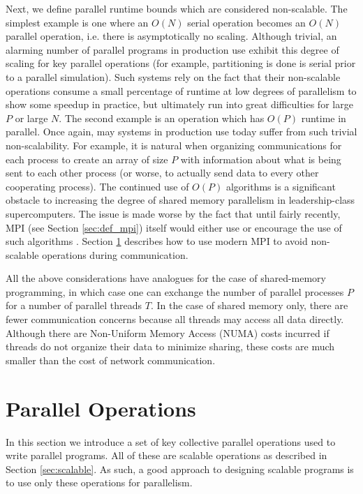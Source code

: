 Next, we define parallel runtime bounds which are considered non-scalable.
The simplest example is one where an $O(N)$ serial operation becomes
an $O(N)$ parallel operation, i.e. there is asymptotically no scaling.
Although trivial, an alarming number of parallel programs in production
use exhibit this degree of scaling for key parallel operations
(for example, partitioning is done is serial prior to a parallel simulation).
Such systems rely on the fact that their non-scalable operations
consume a small percentage of runtime at low degrees of parallelism
to show some speedup in practice, but ultimately run into great difficulties
for large $P$ or large $N$.
The second example is an operation which has $O(P)$ runtime in parallel.
Once again, may systems in production use today suffer from such
trivial non-scalability.
For example, it is natural when organizing communications for each process to create
an array of size $P$ with information about what is being sent to each
other process (or worse, to actually send data to every other cooperating process).
The continued use of $O(P)$ algorithms is a significant obstacle to
increasing the degree of shared memory parallelism in leadership-class supercomputers.
The issue is made worse by the fact that until fairly recently,
MPI (see Section \ref{sec:def_mpi}) itself would either use
or encourage the use of such algorithms \cite{balaji2009mpi}.
Section \ref{sec:paraops} describes how to use modern MPI
to avoid non-scalable operations during communication.

All the above considerations have analogues for the case of shared-memory programming,
in which case one can exchange the number of parallel processes $P$ for a number
of parallel threads $T$.
In the case of shared memory only, there are fewer communication concerns because
all threads may access all data directly.
Although there are Non-Uniform Memory Access (NUMA) costs incurred if threads do
not organize their data to minimize sharing, these costs are much smaller than
the cost of network communication.

\section{Parallel Operations}
\label{sec:paraops}

In this section we introduce a set of key collective parallel operations
used to write parallel programs.
All of these are scalable operations as described in Section \ref{sec:scalable}.
As such, a good approach to designing scalable programs is to use
only these operations for parallelism.

